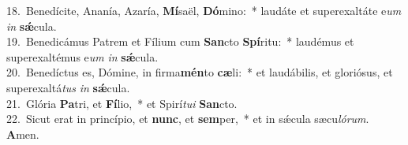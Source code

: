 {18.~}Benedícite, Ananía, Azaría, \textbf{Mí}saël, \textbf{Dó}mino:~* laudáte et superexaltáte e\textit{um} \textit{in} \textbf{sǽ}cula.\\
{19.~}Benedicámus Patrem et Fílium cum \textbf{San}cto \textbf{Spí}ritu:~* laudémus et superexaltémus e\textit{um} \textit{in} \textbf{sǽ}cula.\\
{20.~}Benedíctus es, Dómine, in firma\textbf{mén}to \textbf{cæ}li:~* et laudábilis, et gloriósus, et superexaltá\textit{tus} \textit{in} \textbf{sǽ}cula.\\
{21.~}Glória \textbf{Pa}tri, et \textbf{Fí}lio,~* et Spirí\textit{tu}\textit{i} \textbf{San}cto.\\
{22.~}Sicut erat in princípio, et \textbf{nunc}, et \textbf{sem}per,~* et in sǽcula sæcu\textit{ló}\textit{rum}. \textbf{A}men.\\
